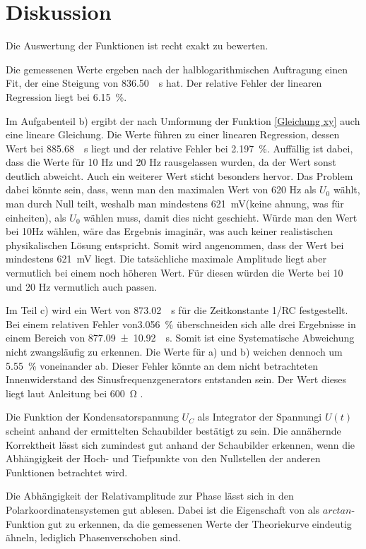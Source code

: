 \section{Diskussion}
\label{sec:Diskussion}

Die Auswertung der Funktionen ist recht exakt zu bewerten. 

Die gemessenen Werte ergeben nach der halblogarithmischen Auftragung einen Fit, der eine Steigung von \SI{836.50}{\per\second} hat. Der relative Fehler der linearen Regression liegt bei \SI{6.15}{\percent}. 

Im Aufgabenteil b) ergibt der nach Umformung der Funktion \eqref{Gleichung xy}  auch eine lineare Gleichung. Die Werte führen zu einer linearen Regression, dessen Wert bei \SI{885.68}{\per\second} liegt und der relative Fehler bei \SI{2.197}{\percent}. Auffällig ist dabei, dass die Werte für 10 Hz und 20 Hz rausgelassen wurden, da der Wert sonst deutlich abweicht. Auch ein weiterer Wert sticht besonders hervor. Das Problem dabei könnte sein, dass, wenn man den maximalen Wert von 620 Hz als $U_{0}$ wählt, man durch Null teilt, weshalb man mindestens \SI{621}{\milli\volt}(keine ahnung, was für einheiten), als $U_{0}$ wählen muss, damit dies nicht geschieht. Würde man den Wert bei 10Hz wählen, wäre das Ergebnis imaginär, was auch keiner realistischen physikalischen Lösung entspricht. Somit wird angenommen, dass der Wert bei mindestens \SI{621}{\milli\volt} liegt. Die tatsächliche maximale Amplitude liegt aber vermutlich bei einem noch höheren Wert. Für diesen würden die Werte bei 10 und 20 Hz vermutlich auch passen. 

Im Teil c) wird ein Wert von \SI{873.02}{\per\second} für die Zeitkonstante 1/RC festgestellt. Bei einem relativen Fehler von\SI{3.056}{\percent} überschneiden sich alle drei Ergebnisse in einem Bereich von \SI{877.09 \pm 10.92}{\per\second}. Somit ist eine Systematische Abweichung nicht zwangsläufig zu erkennen. Die Werte für a) und b) weichen dennoch um \SI{5.55}{\percent} voneinander ab. Dieser Fehler könnte an dem nicht betrachteten Innenwiderstand des Sinusfrequenzgenerators entstanden sein. Der Wert dieses liegt laut Anleitung bei \SI{600}{\ohm} \cite{V353}. 

Die Funktion der Kondensatorspannung $U_{C}$ als Integrator der Spannungi $U(t)$ scheint anhand der ermittelten Schaubilder bestätigt zu sein. Die annähernde Korrektheit lässt sich zumindest gut anhand der Schaubilder erkennen, wenn die Abhängigkeit der Hoch- und Tiefpunkte von den Nullstellen der anderen Funktionen betrachtet wird. 

Die Abhängigkeit der Relativamplitude zur Phase \phi lässt sich in den Polarkoordinatensystemen gut ablesen. Dabei ist die Eigenschaft von \phi als $arctan$-Funktion gut zu erkennen, da die gemessenen Werte der Theoriekurve eindeutig ähneln, lediglich Phasenverschoben sind. 
